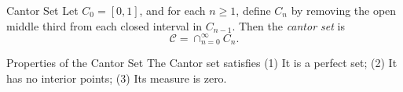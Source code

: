 \begin{definition}{Cantor Set}{}
  Let $C_0 = [0, 1]$, and for each $n \geq 1$, define $C_n$ by removing the open
  middle third from each closed interval in $C_{n-1}$.
  Then the \emph{cantor set} is
  \begin{equation}
    \mathcal{C} = \cap _{n = 0}^{\infty}C_n.
  \end{equation}
\end{definition}

\begin{proposition}{Properties of the Cantor Set}{}
  The Cantor set satisfies
  (1) It is a perfect set;
  (2) It has no interior points;
  (3) Its measure is zero.
\end{proposition}


